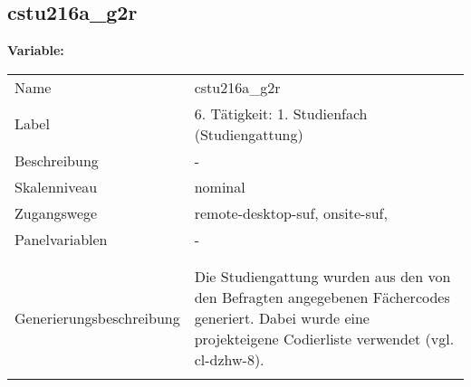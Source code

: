 	
	
	\subsection{cstu216a\_g2r}
	\label{subSection:cstu216a_g2r}

	\noindent\textbf{Variable:}\\
		\begin{tabular}{lL{11.3cm}}
			\label{tableVariable:cstu216a_g2r}
			Name & cstu216a\_g2r \\
			Label & 6. Tätigkeit: 1. Studienfach (Studiengattung) \\
			Beschreibung & - \\
			Skalenniveau & nominal \\
			Zugangswege &
				remote-desktop-suf,
				onsite-suf,
 \\
			Panelvariablen & -
			 \\
			 \\
 \\
					Generierungsbeschreibung & Die Studiengattung wurden aus den von den Befragten angegebenen Fächercodes generiert.  Dabei wurde eine projekteigene Codierliste verwendet (vgl. cl-dzhw-8).
				 \\	
			 \\
		\end{tabular}






